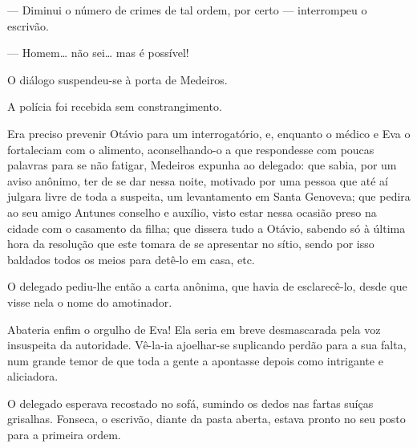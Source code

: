{--- Diminui o número de crimes de tal ordem,
por certo --- interrompeu o escrivão.

--- Homem\ldots{} não sei\ldots{} mas é possível!

O diálogo suspendeu-se à porta de Medeiros.

A polícia foi recebida sem constrangimento.

\enlargethispage{2\baselineskip}

Era preciso prevenir Otávio para um
interrogatório, e, enquanto o médico e Eva o
fortaleciam com o alimento, aconselhando-o a que respondesse com poucas
palavras para se não fatigar, Medeiros expunha ao delegado: que sabia,
por um aviso anônimo, ter de se dar nessa noite, motivado por
uma pessoa que até aí julgara livre de toda a suspeita, um levantamento
em Santa Genoveva; que pedira ao seu amigo Antunes conselho e auxílio,
visto estar nessa ocasião preso na cidade com o casamento da filha; que
dissera tudo a Otávio, sabendo só à última hora da
resolução que este tomara de se apresentar no sítio, sendo por
isso baldados todos os meios para detê-lo em casa, etc.

O delegado pediu-lhe então a carta anônima, que havia de
esclarecê-lo, desde que visse nela o nome do amotinador.


Abateria enfim o orgulho de Eva! Ela seria em breve
desmascarada pela voz insuspeita da autoridade. Vê-la-ia
ajoelhar-se suplicando perdão para a sua falta, num grande temor de que
toda a gente a apontasse depois como intrigante e aliciadora.


O delegado esperava recostado no sofá, sumindo os dedos nas
fartas suíças grisalhas. Fonseca, o escrivão, diante da pasta
aberta, estava pronto no seu posto para a primeira ordem.


}
